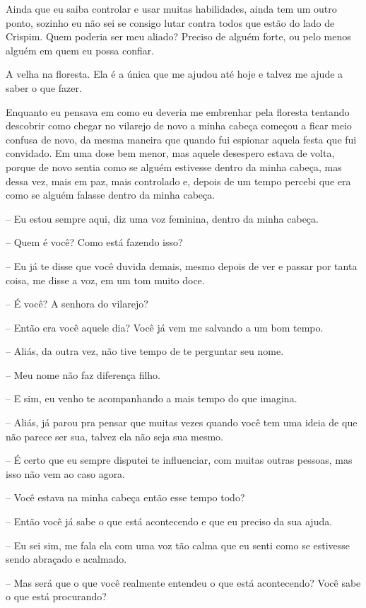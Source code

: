 Ainda que eu saiba controlar e usar muitas habilidades, ainda tem um outro ponto, sozinho eu não sei se consigo lutar contra todos que estão do lado de Crispim. Quem poderia ser meu aliado? Preciso de alguém forte, ou pelo menos alguém em quem eu possa confiar.

A velha na floresta. Ela é a única que me ajudou até hoje e talvez me ajude a saber o que fazer.

Enquanto eu pensava em como eu deveria me embrenhar pela floresta tentando descobrir como chegar no vilarejo de novo a minha cabeça começou a ficar meio confusa de novo, da mesma maneira que quando fui espionar aquela festa que fui convidado. Em uma dose bem menor, mas aquele desespero estava de volta, porque de novo sentia como se alguém estivesse dentro da minha cabeça, mas dessa vez, mais em paz, mais controlado e, depois de um tempo percebi que era como se alguém falasse dentro da minha cabeça.

-- Eu estou sempre aqui, diz uma voz feminina, dentro da minha cabeça.

-- Quem é você? Como está fazendo isso?

-- Eu já te disse que você duvida demais, mesmo depois de ver e passar por tanta coisa, me disse a voz, em um tom muito doce.

-- É você? A senhora do vilarejo?

-- Então era você aquele dia? Você já vem me salvando a um bom tempo.

-- Aliás, da outra vez, não tive tempo de te perguntar seu nome.

-- Meu nome não faz diferença filho.

-- E sim, eu venho te acompanhando a mais tempo do que imagina.

-- Aliás, já parou pra pensar que muitas vezes quando você tem uma ideia de que não parece ser sua, talvez ela não seja sua mesmo.

-- É certo que eu sempre disputei te influenciar, com muitas outras pessoas, mas isso não vem ao caso agora.

-- Você estava na minha cabeça então esse tempo todo?

-- Então você já sabe o que está acontecendo e que eu preciso da sua ajuda.

-- Eu sei sim, me fala ela com uma voz tão calma que eu senti como se estivesse sendo abraçado e acalmado.

-- Mas será que o que você realmente entendeu o que está acontecendo? Você sabe o que está procurando?

